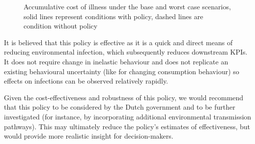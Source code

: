 \begin{figure}[h!]
\begin{minipage}{0.45\textwidth}
        \caption{Accumulative cost of illness under the base and worst case scenarios, solid lines represent conditions with policy, dashed lines are condition without policy}
        \label{fig:ec_bwc_acoi}
    \end{minipage}
\end{figure}

It is believed that this policy is effective as it is a quick and direct means of reducing environmental infection, which subsequently reduces downstream KPIs. It does not require change in inelastic behaviour and does not replicate an existing behavioural uncertainty (like for changing consumption behaviour) so effects on infections can be observed relatively rapidly.

Given the cost-effectiveness and robustness of this policy, we would recommend that this policy to be considered by the Dutch government and to be further investigated (for instance, by incorporating additional environmental transmission pathways). This may ultimately reduce the policy's estimates of effectiveness, but would provide more realistic insight for decision-makers.

